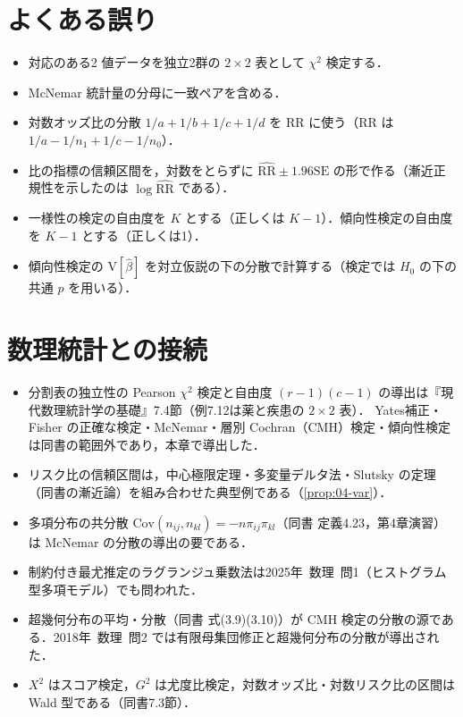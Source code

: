 \documentclass[a4paper,11pt,openany]{ltjsbook}
\newcommand{\kakomonSM}[2]{\mbox{#1年 数理 問#2}}
\newcommand{\V}{\mathrm{V}}
\newcommand{\Cov}{\mathrm{Cov}}
\newcommand{\SE}{\mathrm{SE}}
\newcommand{\RR}{\mathrm{RR}}
\begin{document}
\section{よくある誤り}\label{sec:04-err}
\begin{warnbox}
\begin{itemize}
\item 対応のある2 値データを独立2群の $2\times2$ 表として $\chi^2$ 検定する．
\item McNemar 統計量の分母に一致ペアを含める．
\item 対数オッズ比の分散 $1/a+1/b+1/c+1/d$ を RR に使う（RR は $1/a-1/n_1+1/c-1/n_0$）．
\item 比の指標の信頼区間を，対数をとらずに $\widehat{\RR}\pm1.96\SE$ の形で作る（漸近正規性を示したのは $\log\widehat{\RR}$ である）．
\item 一様性の検定の自由度を $K$ とする（正しくは $K-1$）．傾向性検定の自由度を $K-1$ とする（正しくは1）．
\item 傾向性検定の $\V[\hat\beta]$ を対立仮説の下の分散で計算する（検定では $H_0$ の下の共通 $p$ を用いる）．
\end{itemize}
\end{warnbox}

\section{数理統計との接続}\label{sec:04-link}
\begin{linkbox}
\begin{itemize}
\item 分割表の独立性の Pearson $\chi^2$ 検定と自由度 $(r-1)(c-1)$ の導出は『現代数理統計学の基礎』7.4節（例7.12は薬と疾患の $2\times2$ 表）．
      Yates補正・Fisher の正確な検定・McNemar・層別 Cochran（CMH）検定・傾向性検定は同書の範囲外であり，本章で導出した．
\item リスク比の信頼区間は，中心極限定理・多変量デルタ法・Slutsky の定理（同書の漸近論）を組み合わせた典型例である（\cref{prop:04-var}）．
\item 多項分布の共分散 $\Cov(n_{ij},n_{kl})=-n\pi_{ij}\pi_{kl}$（同書 定義4.23，第4章演習）は McNemar の分散の導出の要である．
\item 制約付き最尤推定のラグランジュ乗数法は\kakomonSM{2025}{1}（ヒストグラム型多項モデル）でも問われた．
\item 超幾何分布の平均・分散（同書 式(3.9)(3.10)）が CMH 検定の分散の源である．\kakomonSM{2018}{2} では有限母集団修正と超幾何分布の分散が導出された．
\item $X^2$ はスコア検定，$G^2$ は尤度比検定，対数オッズ比・対数リスク比の区間は Wald 型である（同書7.3節）．
\end{itemize}
\end{linkbox}
\end{document}
